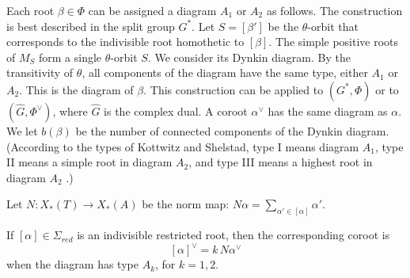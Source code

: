 Each root $\beta\in\Phi$
can be assigned a diagram  $A_1$ or $A_2$ as follows.  
The construction is best described in the split group $G^*$.
Let $S=[\beta']$ be the $\theta$-orbit that corresponds to the indivisible
root homothetic to $[\beta]$.  
The simple
positive roots of $M_S$ form a single $\theta$-orbit $S$.  We consider
its Dynkin diagram.
By the transitivity of $\theta$,  all components of the diagram have the same type,
either  $A_1$
or $A_2$.  This is the diagram  of $\beta$.
This construction can be applied to $(G^*,\Phi)$ or to $(\hat G,\Phi^\vee)$, where $\hat G$
is the complex dual.
A coroot $\alpha^\vee$ has the same diagram  as $\alpha$.
We let $b(\beta)$ be the number of connected components of the Dynkin diagram.
(According to the types of Kottwitz and Shelstad, type I means diagram $A_1$, type II means
a simple root in diagram $A_2$, and type III means a highest root in diagram $A_2$ 
\cite{kottwitz1999foundations}.)



Let $N:X_*(T)\to X_*(A)$ be the norm map: $N\alpha = \sum_{\alpha'\in [\alpha]} \alpha'$.


\begin{lemma}\label{lemma:norm}
If $[\alpha]\in\Sigma_{red}$ is an indivisible restricted root, then the corresponding coroot is
\begin{equation}\label{eqn:norm}
[\alpha]^\vee = k\, N\alpha^\vee
\end{equation}
when the diagram has type $A_k$, for $k=1,2$.
\end{lemma}

